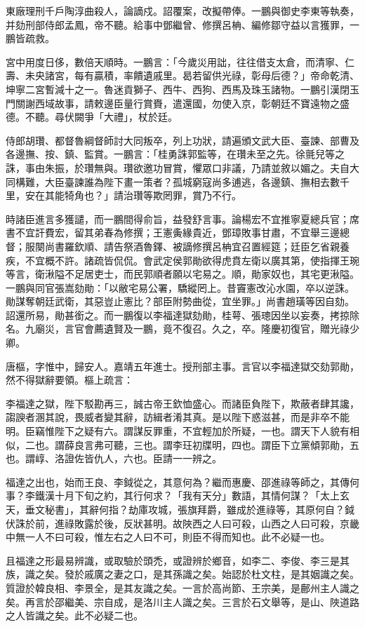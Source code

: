 \begin{pinyinscope}
東廠理刑千戶陶淳曲殺人，論謫戍。詔覆案，改擬帶俸。一鵬與御史李東等執奏，并劾刑部侍郎孟鳳，帝不聽。給事中鄧繼曾、修撰呂柟、編修鄒守益以言獲罪，一鵬皆疏救。

宮中用度日侈，數倍天順時。一鵬言：「今歲災用詘，往往借支太倉，而清寧、仁壽、未央諸宮，每有贏積，率饋遺戚里。曷若留供光祿，彰母后德？」帝命乾清、坤寧二宮暫減十之一。魯迷貢獅子、西牛、西狗、西馬及珠玉諸物。一鵬引漢閉玉門關謝西域故事，請敕邊臣量行賞賚，遣還國，勿使入京，彰朝廷不寶遠物之盛德。不聽。尋伏闕爭「大禮」，杖於廷。

侍郎胡瓚、都督魯綱督師討大同叛卒，列上功狀，請遍頒文武大臣、臺諫、部曹及各邊撫、按、鎮、監賞。一鵬言：「桂勇誅郭監等，在瓚未至之先。徐氈兒等之誅，事由朱振，於瓚無與。瓚欲邀功冒賞，懼眾口非議，乃請並敘以媚之。夫自大同構難，大臣臺諫誰為陛下畫一策者？孤城窮寇尚多逋逃，各邊鎮、撫相去數千里，安在其能犄角也？」請治瓚等欺罔罪，賞乃不行。

時諸臣進言多獲譴，而一鵬間得俞旨，益發舒言事。論楊宏不宜推寧夏總兵官；席書不宜訐費宏，留其弟春為修撰；王憲夤緣貴近，鄧璋敗事甘肅，不宜舉三邊總督；服闋尚書羅欽順、請告祭酒魯鐸、被謫修撰呂柟宜召置經筵；廷臣乞省親養疾，不宜概不許。諸疏皆侃侃。會武定侯郭勛欲得虎賁左衛以廣其第，使指揮王琬等言，衛湫隘不足居吏士，而民郭順者願以宅易之。順，勛家奴也，其宅更湫隘。一鵬與同官張嵩劾勛：「以敝宅易公署，驕縱罔上。昔竇憲改沁水園，卒以逆誅。勛謀奪朝廷武衛，其惡豈止憲比？部臣附勢曲從，宜坐罪。」尚書趙璜等因自劾。詔還所易，勛甚銜之。而一鵬復以李福達獄劾勛，桂萼、張璁因坐以妄奏，拷掠除名。九廟災，言官會薦遺賢及一鵬，竟不復召。久之，卒。隆慶初復官，贈光祿少卿。

唐樞，字惟中，歸安人。嘉靖五年進士。授刑部主事。言官以李福達獄交劾郭勛，然不得獄辭要領。樞上疏言：

李福達之獄，陛下駁勘再三，誠古帝王欽恤盛心。而諸臣負陛下，欺蔽者肆其讒，謅諛者溷其說，畏威者變其辭，訪緝者淆其真。是以陛下惑滋甚，而是非卒不能明。臣竊惟陛下之疑有六。謂謀反罪重，不宜輕加於所疑，一也。謂天下人貌有相似，二也。謂薛良言弗可聽，三也。謂李玨初牒明，四也。謂臣下立黨傾郭勛，五也。謂崞、洛證佐皆仇人，六也。臣請一一辨之。

福達之出也，始而王良、李鉞從之，其意何為？繼而惠慶、邵進祿等師之，其傳何事？李鐵漢十月下旬之約，其行何求？「我有天分」數語，其情何謀？「太上玄天，垂文秘書」，其辭何指？劫庫攻城，張旗拜爵，雖成於進祿等，其原何自？鉞伏誅於前，進祿敗露於後，反狀甚明。故陜西之人曰可殺，山西之人曰可殺，京畿中無一人不曰可殺，惟左右之人曰不可，則臣不得而知也。此不必疑一也。

且福達之形最易辨識，或取驗於頭禿，或證辨於鄉音，如李二、李俊、李三是其族，識之矣。發於戚廣之妻之口，是其孫識之矣。始認於杜文柱，是其姻識之矣。質證於韓良相、李景全，是其友識之矣。一言於高尚節、王宗美，是鄜州主人識之矣。再言於邵繼美、宗自成，是洛川主人識之矣。三言於石文舉等，是山、陜道路之人皆識之矣。此不必疑二也。


\end{pinyinscope}
